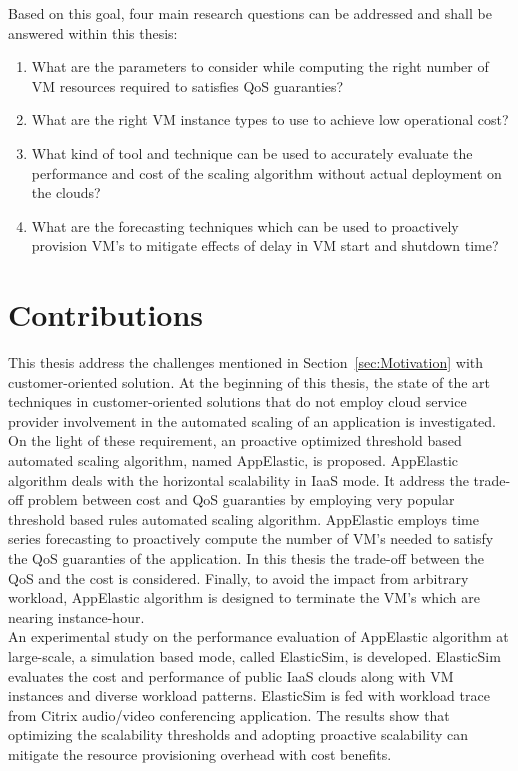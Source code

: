 Based on this goal, four main research questions can be addressed and shall be answered within this thesis:

\begin{enumerate}
  \item What are the parameters to consider while computing the right number of VM resources required to satisfies QoS guaranties?
  \item What are the right VM instance types to use to achieve low operational cost?
  \item What kind of tool and technique can be used to accurately evaluate the performance and cost of the scaling algorithm without actual deployment on the clouds?
  \item What are the forecasting techniques which can be used to proactively provision VM's to mitigate effects of delay in VM start and shutdown time?
\end{enumerate}

\section{Contributions}
\label{sec:Contributions}
This thesis address the challenges mentioned in Section~\ref{sec:Motivation} with customer-oriented solution. At the beginning of this thesis, the state of the art techniques in customer-oriented solutions that do not employ cloud service provider involvement in the automated scaling of an application is investigated. On the light of these requirement, an proactive optimized threshold based\cite{lorido2012auto} automated scaling algorithm, named AppElastic, is proposed. AppElastic algorithm deals with the horizontal scalability\cite{vaquero2011dynamically} in IaaS mode. It address the trade-off problem between cost and QoS guaranties by employing very popular threshold based rules automated scaling algorithm. AppElastic employs time series forecasting to proactively compute the number of VM's needed to satisfy the QoS guaranties of the application. In this thesis the trade-off between the QoS and the cost is considered. Finally, to avoid the impact from arbitrary workload, AppElastic algorithm is designed to terminate the VM's which are nearing instance-hour.
\\
An experimental study on the performance evaluation of AppElastic algorithm at large-scale, a simulation based mode, called ElasticSim, is developed. ElasticSim evaluates the cost and performance of public IaaS clouds along with VM instances and diverse workload patterns. ElasticSim is fed with workload trace from Citrix audio/video conferencing application. The results show that optimizing the scalability thresholds and adopting proactive scalability can mitigate the resource provisioning overhead with cost benefits.




%
